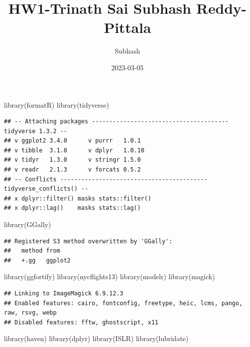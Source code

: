 \documentclass[
]{article}
\title{HW1-Trinath Sai Subhash Reddy-Pittala}
\author{Subhash}
\date{2023-03-05}
\newenvironment{Shaded}{\begin{snugshade}}{\end{snugshade}}
\newcommand{\FunctionTok}[1]{\textcolor[rgb]{0.00,0.00,0.00}{#1}}
\newcommand{\NormalTok}[1]{#1}
\begin{document}
\maketitle

\begin{Shaded}
\begin{Highlighting}[]
\FunctionTok{library}\NormalTok{(formatR)}
\FunctionTok{library}\NormalTok{(tidyverse)}
\end{Highlighting}
\end{Shaded}

\begin{verbatim}
## -- Attaching packages --------------------------------------- tidyverse 1.3.2 --
## v ggplot2 3.4.0      v purrr   1.0.1 
## v tibble  3.1.8      v dplyr   1.0.10
## v tidyr   1.3.0      v stringr 1.5.0 
## v readr   2.1.3      v forcats 0.5.2 
## -- Conflicts ------------------------------------------ tidyverse_conflicts() --
## x dplyr::filter() masks stats::filter()
## x dplyr::lag()    masks stats::lag()
\end{verbatim}

\begin{Shaded}
\begin{Highlighting}[]
\FunctionTok{library}\NormalTok{(GGally)}
\end{Highlighting}
\end{Shaded}

\begin{verbatim}
## Registered S3 method overwritten by 'GGally':
##   method from   
##   +.gg   ggplot2
\end{verbatim}

\begin{Shaded}
\begin{Highlighting}[]
\FunctionTok{library}\NormalTok{(ggfortify)}
\FunctionTok{library}\NormalTok{(nycflights13)}
\FunctionTok{library}\NormalTok{(modelr)}
\FunctionTok{library}\NormalTok{(magick)}
\end{Highlighting}
\end{Shaded}

\begin{verbatim}
## Linking to ImageMagick 6.9.12.3
## Enabled features: cairo, fontconfig, freetype, heic, lcms, pango, raw, rsvg, webp
## Disabled features: fftw, ghostscript, x11
\end{verbatim}

\begin{Shaded}
\begin{Highlighting}[]
\FunctionTok{library}\NormalTok{(haven)}
\FunctionTok{library}\NormalTok{(dplyr)}
\FunctionTok{library}\NormalTok{(ISLR)}
\FunctionTok{library}\NormalTok{(lubridate)}
\end{Highlighting}
\end{Shaded}
\end{document}

